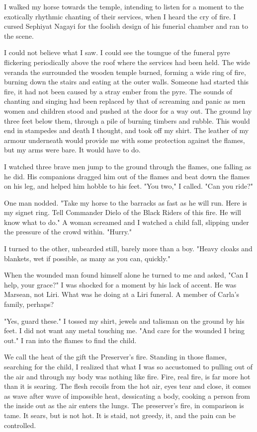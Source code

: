 \documentclass{article}
\begin{document}
I walked my horse towards the temple, intending to listen for a moment to the exotically rhythmic chanting of their services, when I heard the cry of fire. I cursed Sephiyat Nagayi for the foolish design of his funerial chamber and ran to the scene. 

I could not believe what I saw. I could see the toungue of the funeral pyre flickering periodically above the roof where the services had been held. The wide veranda the surrounded the wooden temple burned, forming a wide ring of fire, burning down the stairs and eating at the outer walls. Someone had started this fire, it had not been caused by a stray ember from the pyre. The sounds of chanting and singing had been replaced by that of screaming and panic as men women and children stood and pushed at the door for a way out. The ground lay three feet below them, through a pile of burning timbers and rubble. This would end in stampedes and death I thought, and took off my shirt. The leather of my armour underneath would provide me with some protection against the flames, but my arms were bare. It would have to do. 

I watched three brave men jump to the ground through the flames, one falling as he did. His companions dragged him out of the flames and beat down the 
flames on his leg, and helped him hobble to his feet. "You two," I called. "Can you ride?"

One man nodded. "Take my horse to the barracks as fast as he will run. Here is my signet ring. Tell Commander Dielo of the Black Riders of this fire. He will know what to do." A woman screamed and I watched a child fall, slipping under the pressure of the crowd within. "Hurry."

I turned to the other, unbearded still, barely more than a boy. "Heavy cloaks and blankets, wet if possible, as many as you can, quickly."

When the wounded man found himself alone he turned to me and asked, "Can I help, your grace?"  I was shocked for a moment by his lack of accent. He was Marsean, not Liri. What was he doing at a Liri funeral. A member of Carla's family, perhaps?

"Yes, guard these." I tossed my shirt, jewels and talisman on the ground by his feet. I did not want any metal touching me. "And care for the wounded I bring out." I ran into the flames to find the child. 

We call the heat of the gift the Preserver's fire. Standing in those flames, searching for the child, I realized that what I was so accustomed to pulling out of the air and through my body was nothing like fire. Fire, real fire, is far more hot than it is searing. The flesh recoils from the hot air, eyes tear and close, it comes as wave after wave of impossible heat, dessicating a body, cooking a person from the inside out as the air enters the lungs. The preserver's fire, in comparison is tame. It sears, but is not hot. It is staid, not greedy, it, and the pain can be controlled. 
\end{document}
